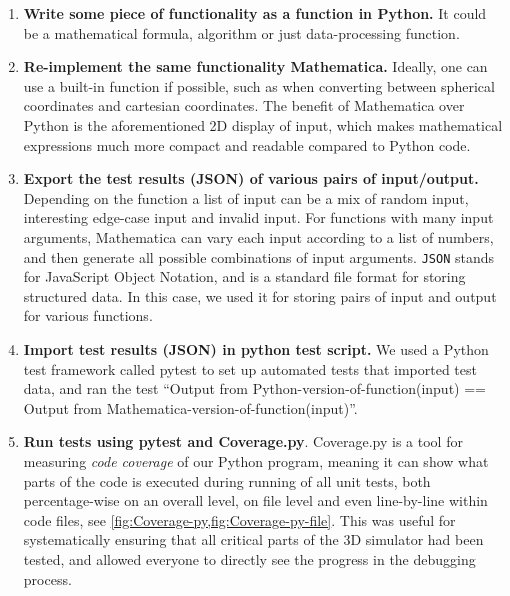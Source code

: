 \begin{enumerate}
	\item \textbf{Write some piece of functionality as a function in Python.} It could be a mathematical formula, algorithm or just data-processing function.
	\item \textbf{Re-implement the same functionality Mathematica.} Ideally, one can use a built-in function if possible, such as when converting between spherical coordinates and cartesian coordinates. The benefit of Mathematica over Python is the aforementioned 2D display of input, which makes mathematical expressions much more compact and readable compared to Python code.
	\item \textbf{Export the test results (JSON) of various pairs of input/output.} Depending on the function a list of input can be a mix of random input, interesting edge-case input and invalid input. For functions with many input arguments, Mathematica can vary each input according to a list of numbers, and then generate all possible combinations of input arguments. \texttt{JSON} stands for JavaScript Object Notation, and is a standard file format for storing structured data. In this case, we used it for storing pairs of input and output for various functions.
	\item \textbf{Import test results (JSON) in python test script.} We used a Python test framework called pytest to set up automated tests that imported test data, and ran the test ``Output from Python-version-of-function(input) == Output from Mathematica-version-of-function(input)''.
	\item \textbf{Run tests using pytest and Coverage.py}. Coverage.py is a tool for measuring \emph{code coverage} of our Python program, meaning it can show what parts of the code is executed during running of all unit tests, both percentage-wise on an overall level, on file level and even line-by-line within code files, see \cref{fig:Coverage-py,fig:Coverage-py-file}. This was useful for systematically ensuring that all critical parts of the 3D simulator had been tested, and allowed everyone to directly see the progress in the debugging process.
\end{enumerate}


